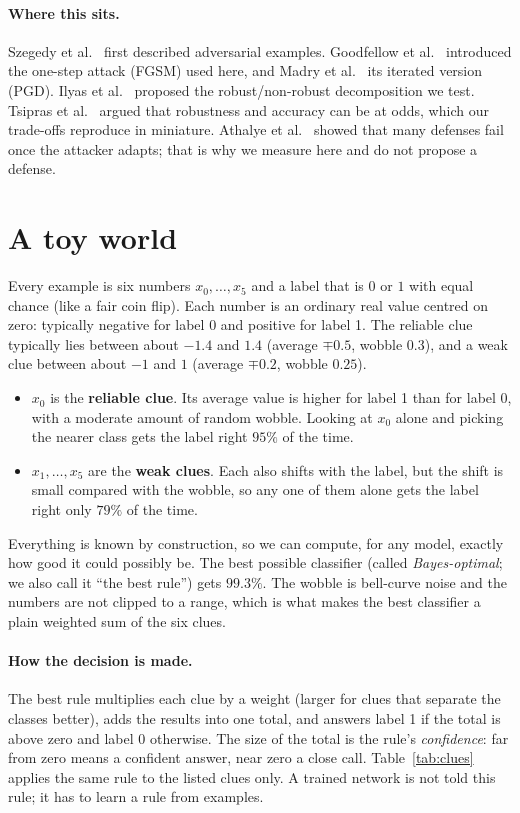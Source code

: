 \documentclass[11pt]{article}
\begin{document}
\paragraph{Where this sits.} Szegedy et al.~\cite{szegedy2014} first described adversarial examples. Goodfellow et al.~\cite{goodfellow2015}
introduced the one-step attack (FGSM) used here, and Madry et al.~\cite{madry2018} its iterated version (PGD).
Ilyas et al.~\cite{ilyas2019} proposed the robust/non-robust decomposition we test. Tsipras et al.~\cite{tsipras2018} argued that robustness and accuracy can be at odds,
which our trade-offs reproduce in miniature. Athalye et al.~\cite{athalye2018} showed that many defenses fail once the attacker adapts;
that is why we measure here and do not propose a defense.

\section{A toy world}
\label{sec:world}

Every example is six numbers $x_0,\ldots,x_5$ and a label that is $0$ or $1$ with equal chance (like a fair coin flip). Each number is an ordinary real value centred on zero: typically negative for label 0 and positive for label 1. The reliable clue typically lies between about $-1.4$ and $1.4$ (average $\mp0.5$, wobble $0.3$), and a weak clue between about $-1$ and $1$ (average $\mp0.2$, wobble $0.25$).

\begin{itemize}
\item $x_0$ is the \textbf{reliable clue}. Its average value is higher for label 1 than for label 0, with a
moderate amount of random wobble. Looking at $x_0$ alone and picking the nearer class gets the label right
$95\%$ of the time.
\item $x_1,\ldots,x_5$ are the \textbf{weak clues}. Each also shifts with the label, but the shift is small compared
with the wobble, so any one of them alone gets the label right only $79\%$ of the time.
\end{itemize}

Everything is known by construction, so we can compute, for any model, exactly how good it could possibly be.
The best possible classifier (called \emph{Bayes-optimal}; we also call it ``the best rule'') gets $99.3\%$. The wobble is bell-curve noise and the
numbers are not clipped to a range, which is what makes the best classifier a plain weighted sum of the six clues.

\paragraph{How the decision is made.} The best rule multiplies each clue by a weight (larger for clues that separate the classes better), adds the results into one total, and answers label 1 if the total is above zero and label 0 otherwise. The size of the total is the rule's \emph{confidence}: far from zero means a confident answer, near zero a close call. Table~\ref{tab:clues} applies the same rule to the listed clues only. A trained network is not told this rule; it has to learn a rule from examples.
\end{document}
